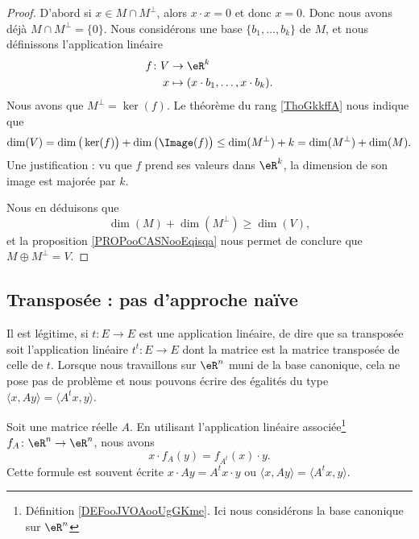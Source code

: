 \begin{proof}
	D'abord si \( x\in M\cap M^{\perp}\), alors \( x\cdot x=0\) et donc \( x=0\). Donc nous avons déjà \( M\cap M^{\perp}=\{ 0 \}\). Nous considérons une base \( \{b_1,\ldots, b_k\}\) de \( M\), et nous définissons l'application linéaire
	\begin{equation}
		\begin{aligned}
			f\colon V & \to \eR^k                                \\
			x         & \mapsto (x\cdot b_1,\ldots, x\cdot b_k).
		\end{aligned}
	\end{equation}
	Nous avons que \( M^{\perp}=\ker(f)\). Le théorème du rang \ref{ThoGkkffA} nous indique que
	\begin{equation}
		\dim(V)=\dim\big( \ker(f) \big)+\dim\big( \Image(f) \big)\leq \dim(M^{\perp})+k=\dim(M^{\perp})+\dim(M).
	\end{equation}
	Une justification : vu que \( f\) prend ses valeurs dans \( \eR^k\), la dimension de son image est majorée par \( k\).

	Nous en déduisons que
	\begin{equation}
		\dim(M)+\dim(M^{\perp})\geq\dim(V),
	\end{equation}
	et la proposition \ref{PROPooCASNooEqisqa} nous permet de conclure que \( M\oplus M^{\perp}=V\).
\end{proof}


\subsection{Transposée : pas d'approche naïve}
\label{SUBSECooGPXVooEYwIiJ}

Il est légitime, si \( t\colon E\to E\) est une application linéaire, de dire que sa transposée soit l'application linéaire \( t^t\colon E\to E\) dont la matrice est la matrice transposée de celle de \( t\). Lorsque nous travaillons sur \( \eR^n\) muni de la base canonique, cela ne pose pas de problème et nous pouvons écrire des égalités du type \( \langle x, Ay\rangle =\langle A^tx, y\rangle \).

\begin{proposition}     \label{PROPooNARVooEuhweD}
	Soit une matrice réelle \( A\). En utilisant l'application linéaire associée\footnote{Définition \ref{DEFooJVOAooUgGKme}. Ici nous considérons la base canonique sur \( \eR^n\)} \( f_A\colon \eR^n\to \eR^n\), nous avons
	\begin{equation}
		x\cdot f_A(y)=f_{A^t}(x)\cdot y.
	\end{equation}
	Cette formule est souvent écrite \( x\cdot Ay=A^tx\cdot y\) ou \( \langle x, Ay\rangle =\langle A^tx, y\rangle \).
\end{proposition}

